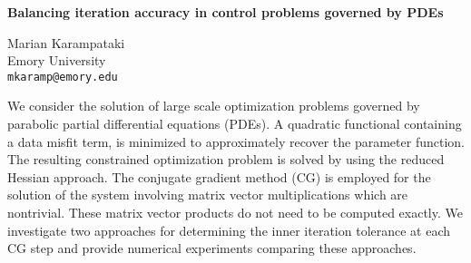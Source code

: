 \documentclass{report}
\begin{document}

\begin{center}
{\large
{\bf Balancing iteration accuracy in control problems governed by PDEs}}

	Marian Karampataki \\
	Emory University \\
	{\tt mkaramp@emory.edu}
\end{center}
We consider the solution of large scale optimization
problems governed by parabolic partial differential
equations (PDEs). A quadratic functional containing a data
misfit term, is minimized to approximately recover the
parameter function.  The resulting constrained optimization
problem is solved by using the reduced Hessian approach. The
conjugate gradient method (CG) is employed for the solution
of the system involving matrix vector multiplications which
are nontrivial. These matrix vector products do not need to
be computed exactly. We investigate two approaches for
determining the inner iteration tolerance at each CG step
and provide numerical experiments comparing these
approaches.


\end{document}
